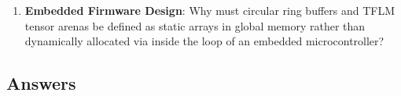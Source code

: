 \begin{checkyourself}
\begin{enumerate}
    \begin{itemize}
        \item Sampling: $t_{\text{sample}} = 2.0\,\text{seconds}$ at $I_{\text{sample}} = 30.0\,\text{mA}$.
        \item Inference: $t_{\text{inf}} = 20\,\text{milliseconds}$ ($0.020\,\text{s}$) at $I_{\text{inf}} = 50.0\,\text{mA}$.
        \item Deep Sleep: Remainder of the 120-second cycle at $I_{\text{sleep}} = 20\,\mu\text{A}$ ($0.020\,\text{mA}$).
    \end{itemize}
    \begin{enumerate}
        \item Calculate the electrical charge in $\text{mA}\cdot\text{s}$ consumed during each 120-second cycle.
        \item Compute the average current consumption ($I_{\text{avg}}$).
        \item Calculate the expected operational battery longevity in days.
        \item If the device streamed raw data continuously over Wi-Fi ($150\,\text{mA}$), how long would the battery last?
    \end{enumerate}
    \item \textbf{Embedded Firmware Design}: Why must circular ring buffers and TFLM tensor arenas be defined as static arrays in global memory rather than dynamically allocated via  inside the loop of an embedded microcontroller?
\end{enumerate}
\end{checkyourself}

\subsection*{Answers}

